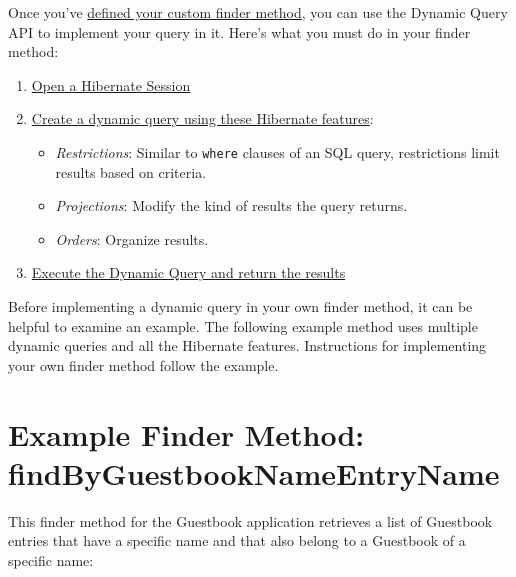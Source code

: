 Once you've
\href{/docs/7-2/appdev/-/knowledge_base/a/defining-a-custom-finder-method}{defined
your custom finder method}, you can use the Dynamic Query API to
implement your query in it. Here's what you must do in your finder
method:

\begin{enumerate}
\def\labelenumi{\arabic{enumi}.}
\item
  \hyperref[using-a-hibernate-session]{Open a Hibernate Session}
\item
  \hyperref[creating-dynamic-queries]{Create a dynamic query using these
  Hibernate features}:

  \begin{itemize}
  \tightlist
  \item
    \emph{Restrictions}: Similar to \texttt{where} clauses of an SQL
    query, restrictions limit results based on criteria.
  \item
    \emph{Projections}: Modify the kind of results the query returns.
  \item
    \emph{Orders}: Organize results.
  \end{itemize}
\item
  \hyperref[executing-the-dynamic-query]{Execute the Dynamic Query and
  return the results}
\end{enumerate}

Before implementing a dynamic query in your own finder method, it can be
helpful to examine an example. The following example method uses
multiple dynamic queries and all the Hibernate features. Instructions
for implementing your own finder method follow the example.

\section{Example Finder Method:
findByGuestbookNameEntryName}\label{example-finder-method-findbyguestbooknameentryname}

This finder method for the Guestbook application retrieves a list of
Guestbook entries that have a specific name and that also belong to a
Guestbook of a specific name:


